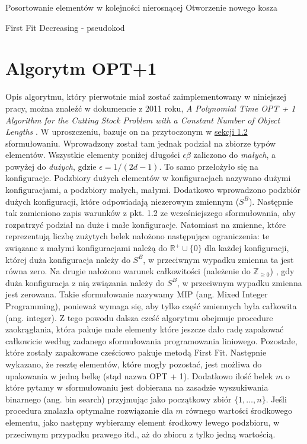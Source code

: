 \begin{algorithm}[H]
	Posortowanie elementów w kolejności nierosnącej \;
	Otworzenie nowego kosza \;
	
	\caption{First Fit Decreasing - pseudokod}
\end{algorithm}


\section{Algorytm OPT+1}
Opis algorytmu, który pierwotnie miał zostać zaimplementowany w niniejszej pracy, można znaleźć w dokumencie z 2011 roku, \textit{A Polynomial Time OPT + 1 Algorithm for the Cutting Stock Problem with a Constant Number of Object Lengths} \cite{ALG_OPT_1}. 
W uproszczeniu, bazuje on na przytoczonym w 
\hyperlink{section.1.2}{sekcji 1.2} sformułowaniu.
Wprowadzony został tam jednak podział na zbiorze typów elementów. 
Wszystkie elementy poniżej długości $\epsilon\beta$ zaliczono do \textit{małych}, a powyżej do \textit{dużych}, gdzie $\epsilon = 1/(2d-1)$. To samo przełożyło się na konfiguracje. Podzbiory dużych elementów w konfiguracjach nazywano dużymi konfiguracjami, a podzbiory małych, małymi. Dodatkowo wprowadzono podzbiór dużych konfiguracji, które odpowiadają niezerowym zmiennym ($S^B$). Następnie tak zamieniono zapis warunków z pkt. 1.2 ze wcześniejszego sformułowania, aby rozpatrzyć podział na duże i małe konfiguracje. Natomiast na zmienne, które reprezentują liczbę zużytych belek nałożono następujące ograniczenia: te związane z małymi konfiguracjami należą do $\mathbb{R}^+\cup \{0\}$ dla każdej konfiguracji, której duża konfiguracja należy do $S^B$, w przeciwnym wypadku zmienna ta jest równa zero. Na drugie nałożono warunek całkowitości (należenie do $\mathbb{Z}_{\geq 0}$) , gdy duża konfiguracja z nią związania należy do $S^B$, w przeciwnym wypadku zmienna jest zerowana.
Takie sformułowanie nazywamy MIP (ang. Mixed Integer Programming), ponieważ wymaga się, aby tylko część zmiennych była całkowita (ang. integer).
Z tego powodu dalsza cześć algorytmu obejmuje procedure zaokrąglania, która pakuje małe elementy które jeszcze dało radę zapakować całkowicie według zadanego sformułowania programowania liniowego. Pozostałe, które zostały zapakowane cześciowo pakuje metodą First Fit. Następnie wykazano, że resztę elementów, które mogły pozostać, jest możliwa do upakowania w jedną belkę (stąd nazwa OPT + 1). Dodatkowo ilość belek $m$ o które pytamy w sformułowaniu jest dobierana na zasadzie wyszukiwania binarnego (ang. bin search) przyjmując jako początkowy zbiór $\{1,\dots, n\}$. Jeśli procedura znalazła optymalne rozwiązanie dla $m$ równego wartości środkowego elementu, jako następny wybieramy element środkowy lewego podzbioru, w przeciwnym przypadku prawego itd., aż do zbioru z tylko jedną wartością. \\
